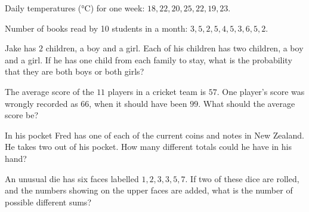 \documentclass{article}
\theoremstyle{mytheoremstyle}
\theoremstyle{mytheoremstyle}
\theoremstyle{myproblemstyle}
\theoremstyle{myproblemstyle}
\begin{document}
    \begin{problem}
        Daily temperatures (°C) for one week: $18, 22, 20, 25, 22, 19, 23$.

    \end{problem}

    \begin{problem}
        Number of books read by 10 students in a month: $3, 5, 2, 5, 4, 5, 3, 6, 5, 2$.
    \end{problem}

    \begin{problem}
        Jake has $2$ children, a boy and a girl. Each of his children has two children, a boy and a girl. If he has one child from each family to stay, what is the probability that they are both boys or both girls?
    \end{problem}

    \begin{problem}
        The average score of the $11$ players in a cricket team is $57$. One player's score was wrongly recorded as $66$, when it should have been $99$. What should the average score be?
    \end{problem}

    \begin{problem}
        In his pocket Fred has one of each of the current coins and notes in New Zealand. He takes two out of his pocket. How many different totals could he have in his hand?
    \end{problem}

    \begin{problem}
        An unusual die has six faces labelled $1, 2, 3, 3, 5, 7$. If two of these dice are rolled, and the numbers showing on the upper faces are added, what is the number of possible different sums?
    \end{problem}
\end{document}
